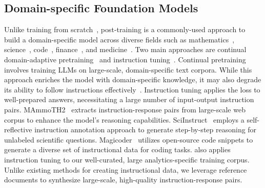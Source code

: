 \subsection{Domain-specific Foundation Models}
Unlike training from scratch~\citep{wu2023bloomberggpt}, post-training is a commonly-used approach to build a domain-specific model across diverse fields such as mathematics~\citep{yue2024mammoth}, science~\citep{taylor2023galactica}, code~\citep{gunasekar2023textbooks}, finance~\citep{wu2023bloomberggpt}, and medicine~\citep{wu2024pmc}. Two
main approaches are continual domain-adaptive pretraining~\citep{mendieta2023towards,xie2023efficient} and instruction tuning~\citep{zhang2023instruction}. 
Continual pretraining involves training LLMs on large-scale, domain-specific text corpora. While this approach enriches the model with domain-specific knowledge, it may also degrade its ability to follow instructions effectively~\citep{ke2023continual}.
%
Instruction tuning applies the loss to well-prepared answers, necessitating a large number of input-output instruction pairs. 
%
MAmmoTH2~\citep{yue2024mammoth2} extracts instruction-response pairs from large-scale web corpus to enhance the model's reasoning capabilities. SciInstruct~\citep{zhangsciinstruct} employs a self-reflective instruction annotation approach to generate step-by-step reasoning for unlabeled scientific questions. Magicoder~\citep{wei2024magicoder} utilizes open-source code snippets to generate a diverse set of instructional data for coding tasks.
\modelname also applies instruction tuning to our well-curated, large analytics-specific training corpus. Unlike existing methods for creating instructional data, we leverage reference documents to synthesize large-scale, high-quality instruction-response pairs.